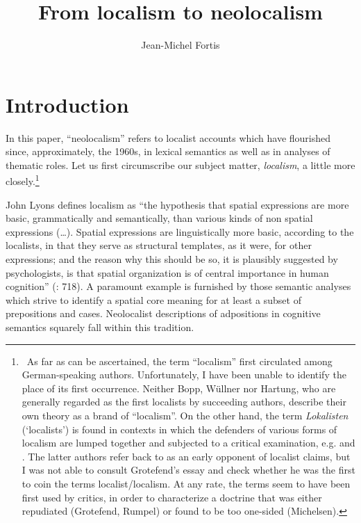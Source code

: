 \documentclass[output=paper]{langscibook}
\author{Jean-Michel Fortis\affiliation{Research team Histoire des Théories Linguistiques, CNRS, Université de Paris}\orcid{}}
\title{From localism to neolocalism}
\begin{document}
\maketitle

\section{Introduction}
In this paper, “neolocalism” refers to localist accounts which have flourished since, approximately, the 1960s, in lexical semantics as well as in analyses of thematic roles. Let us first circumscribe our subject matter, \textit{localism}, a little more closely.\footnote{\textrm{~As far as can be ascertained, the term “localism” first circulated among German-speaking authors. Unfortunately, I have been unable to identify the place of its first occurrence. Neither Bopp, Wüllner nor Hartung, who are generally regarded as the first localists by succeeding authors, describe their own theory as a brand of “localism”. On the other hand, the term }\textrm{\textit{Lokalisten}}\textrm{ (‘localists’) is found in contexts in which the defenders of various forms of localism are lumped together and subjected to a critical examination, e.g. \citet{michelsen_philosophie_1843} and \citet{rumpel_casuslehre_1845}. The latter authors refer back to \citet{grotefend_data_1835} as an early opponent of localist claims, but I was not able to consult Grotefend’s essay and check whether he was the first to coin the terms localist/localism. At any rate, the terms seem to have been first used by critics, in order to characterize a doctrine that was either repudiated (Grotefend, Rumpel) or found to be too one-sided (Michelsen).}} 
 
John Lyons defines localism as “the hypothesis that spatial expressions are more basic, grammatically and semantically, than various kinds of non spatial expressions (…). Spatial expressions are linguistically more basic, according to the localists, in that they serve as structural templates, as it were, for other expressions; and the reason why this should be so, it is plausibly suggested by psychologists, is that spatial organization is of central importance in human cognition” (\citealt{lyons_semantics_1977}: 718). A paramount example is furnished by those semantic analyses which strive to identify a spatial core meaning for at least a subset of prepositions and cases. Neolocalist descriptions of adpositions in cognitive semantics squarely fall within this tradition.
 
\end{document}
